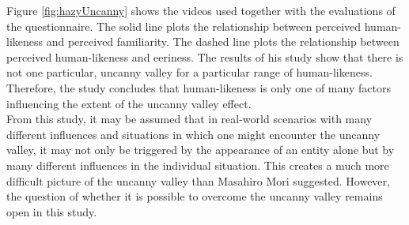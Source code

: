 Figure \ref{fig:hazyUncanny} shows the videos used together with the evaluations of the questionnaire. The solid line plots the relationship between perceived human-likeness and perceived familiarity. The dashed line plots the relationship between perceived human-likeness and eeriness. The results of his study show that there is not one particular, uncanny valley for a particular range of human-likeness. Therefore, the study concludes that human-likeness is only one of many factors influencing the extent of the uncanny valley effect.\\
From this study, it may be assumed that in real-world scenarios with many different influences and situations in which one might encounter the uncanny valley, it may not only be triggered by the appearance of an entity alone but by many different influences in the individual situation. This creates a much more difficult picture of the uncanny valley than Masahiro Mori suggested. However, the question of whether it is possible to overcome the uncanny valley remains open in this study.

